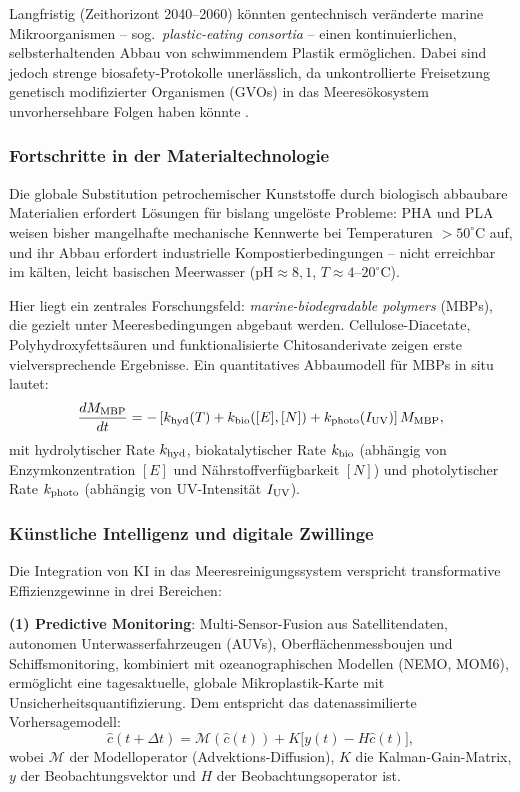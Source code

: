 ﻿\documentclass[12pt,a4paper]{article}
\theoremstyle{definition}
\theoremstyle{remark}
\newcommand{\MP}{Mikroplastik}
\begin{document}
Langfristig (Zeithorizont 2040--2060) k\"onnten gentechnisch ver\"anderte
marine Mikroorganismen -- sog.\ \textit{plastic-eating consortia} --
einen kontinuierlichen, selbsterhaltenden Abbau von
schwimmendem Plastik erm\"oglichen. Dabei sind jedoch strenge
biosafety-Protokolle unerl\"asslich, da unkontrollierte Freisetzung
genetisch modifizierter Organismen (GVOs) in das Meeresökosystem
unvorhersehbare Folgen haben k\"onnte \cite{yang2021plastics}.

\subsubsection{Fortschritte in der Materialtechnologie}

Die globale Substitution petrochemischer Kunststoffe durch biologisch
abbaubare Materialien erfordert L\"osungen f\"ur bislang ungelöste
Probleme: PHA und PLA weisen bisher mangelhafte mechanische Kennwerte
bei Temperaturen $> 50^\circ$C auf, und ihr Abbau erfordert industrielle
Kompostierbedingungen -- nicht erreichbar im k\"alten, leicht basischen
Meerwasser ($\text{pH} \approx 8{,}1$, $T \approx 4$--$20^\circ$C).

Hier liegt ein zentrales Forschungsfeld: \textit{marine-biodegradable
polymers} (MBPs), die gezielt unter Meeresbedingungen abgebaut werden.
Cellulose-Diacetate, Polyhydroxyfettsäuren und funktionalisierte
Chitosanderivate zeigen erste vielversprechende Ergebnisse. Ein quantitatives Abbaumodell f\"ur MBPs
in situ lautet:
\begin{equation}
  \frac{dM_{\rm MBP}}{dt} = -\left[k_{\rm hyd}(T) + k_{\rm bio}([E], [N])
  + k_{\rm photo}(I_{\rm UV})\right] M_{\rm MBP},
\end{equation}
mit hydrolytischer Rate $k_{\rm hyd}$, biokatalytischer Rate $k_{\rm bio}$
(abh\"angig von Enzymkonzentration $[E]$ und N\"ahrstoffverfügbarkeit $[N]$)
und photolytischer Rate $k_{\rm photo}$ (abh\"angig von UV-Intensit\"at $I_{\rm UV}$).

\subsubsection{K\"unstliche Intelligenz und digitale Zwillinge}

Die Integration von KI in das Meeresreinigungssystem verspricht
transformative Effizienzgewinne in drei Bereichen:

\textbf{(1) Predictive Monitoring}: Multi-Sensor-Fusion aus Satellitendaten,
autonomen Unterwasserfahrzeugen (AUVs), Oberfl\"achenmessboujen und
Schiffsmonitoring, kombiniert mit ozeanographischen Modellen (NEMO, MOM6),
erm\"oglicht eine tagesaktuelle, globale \MP{}-Karte mit Unsicherheitsquantifizierung.
Dem entspricht das datenassimilierte Vorhersagemodell:
\begin{equation}
  \hat{c}(t+\Delta t) = \mathcal{M}(\hat{c}(t)) + K\bigl[y(t) - H\hat{c}(t)\bigr],
\end{equation}
wobei $\mathcal{M}$ der Modelloperator (Advektions-Diffusion), $K$ die
Kalman-Gain-Matrix, $y$ der Beobachtungsvektor und $H$ der Beobachtungsoperator ist.
\end{document}
